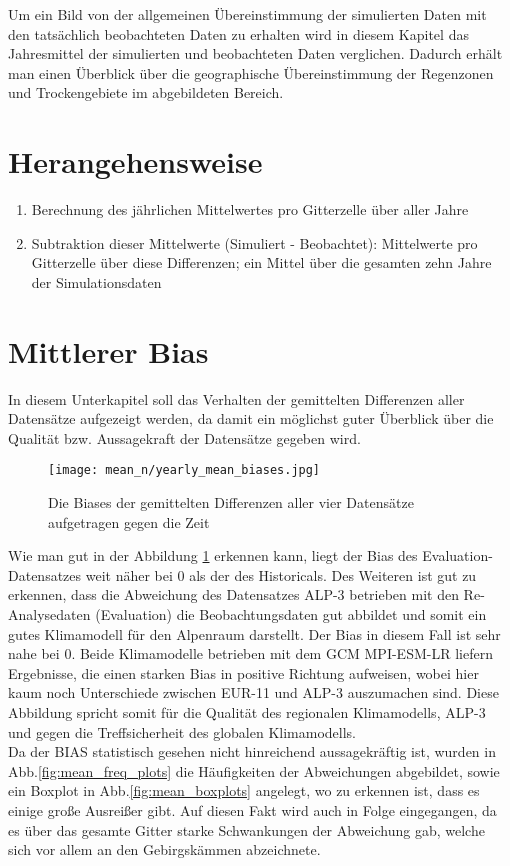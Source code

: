 Um ein Bild von der allgemeinen Übereinstimmung der simulierten Daten mit den tatsächlich beobachteten Daten zu erhalten wird in diesem Kapitel das Jahresmittel der simulierten und beobachteten Daten verglichen. Dadurch erhält man einen Überblick über die geographische Übereinstimmung der Regenzonen und Trockengebiete im abgebildeten Bereich.
\section{Herangehensweise}
\begin{enumerate}
	\item Berechnung des jährlichen Mittelwertes pro Gitterzelle über aller Jahre
	\item Subtraktion dieser Mittelwerte (Simuliert - Beobachtet): Mittelwerte pro Gitterzelle über diese Differenzen; ein Mittel über die gesamten zehn Jahre der Simulationsdaten	
\end{enumerate}
\section{Mittlerer Bias}
In diesem Unterkapitel soll das Verhalten der gemittelten Differenzen aller Datensätze aufgezeigt werden, da damit ein möglichst guter Überblick über die Qualität bzw. Aussagekraft der Datensätze gegeben wird.
\begin{figure}[h]
	\texttt{[image: mean\_n/yearly\_mean\_biases.jpg]}
	\caption{Die Biases der gemittelten Differenzen aller vier Datensätze aufgetragen gegen die Zeit}
	\label{fig:yearly_mean_biases}
\end{figure}
Wie man gut in der Abbildung \ref{fig:yearly_mean_biases} erkennen kann, liegt der Bias des Evaluation- Datensatzes weit näher bei 0 als der des Historicals. Des Weiteren ist gut zu erkennen, dass die Abweichung des Datensatzes ALP-3 betrieben mit den Re-Analysedaten (Evaluation) die Beobachtungsdaten gut abbildet und somit ein gutes Klimamodell für den Alpenraum darstellt. Der Bias in diesem Fall ist sehr nahe bei 0. Beide Klimamodelle betrieben mit dem GCM MPI-ESM-LR liefern Ergebnisse, die einen starken Bias in positive Richtung aufweisen, wobei hier kaum noch Unterschiede zwischen EUR-11 und ALP-3 auszumachen sind. Diese Abbildung spricht somit für die Qualität des regionalen Klimamodells, ALP-3 und gegen die Treffsicherheit des globalen Klimamodells.\\
Da der BIAS statistisch gesehen nicht hinreichend aussagekräftig ist, wurden in Abb.\ref{fig:mean_freq_plots} die Häufigkeiten der Abweichungen abgebildet, sowie ein Boxplot in Abb.\ref{fig:mean_boxplots} angelegt, wo zu erkennen ist, dass es einige große Ausreißer gibt. Auf diesen Fakt wird auch in Folge eingegangen, da es über das gesamte Gitter starke Schwankungen der Abweichung gab, welche sich vor allem an den Gebirgskämmen abzeichnete.\\

